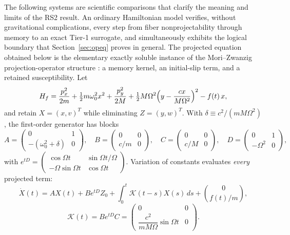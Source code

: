 \documentclass[11pt,a4paper]{article}
\theoremstyle{plain}
\theoremstyle{definition}
\begin{document}
The following systems are scientific comparisons that clarify the meaning
and limits of the RS2 result. An ordinary Hamiltonian model verifies, without gravitational
complications, every step from fiber nonprojectability through memory to
an exact Tier-1 surrogate, and simultaneously exhibits the logical
boundary that Section~\ref{sec:opeq} proves in general. The projected
equation obtained below is the elementary exactly soluble instance of the
Mori--Zwanzig projection-operator structure \cite{MoriZwanzig}: a memory
kernel, an initial-slip term, and a retained susceptibility. Let
\begin{equation}
\label{eq:Hosc}
H_f=\frac{p_x^2}{2m}+\tfrac12 m\omega_0^2x^2
+\frac{p_y^2}{2M}
+\tfrac12 M\Omega^2\Bigl(y-\frac{cx}{M\Omega^2}\Bigr)^2
-f(t)\,x ,
\end{equation}
and retain $X=(x,v)^T$ while eliminating $Z=(y,w)^T$. With
$\delta\equiv c^2/(mM\Omega^2)$, the first-order generator has blocks
\begin{equation}
\label{eq:blocks}
A=\begin{pmatrix}0&1\\-(\omega_0^2+\delta)&0\end{pmatrix},
\quad
B=\begin{pmatrix}0&0\\c/m&0\end{pmatrix},
\quad
C=\begin{pmatrix}0&0\\c/M&0\end{pmatrix},
\quad
D=\begin{pmatrix}0&1\\-\Omega^2&0\end{pmatrix},
\end{equation}
with
$e^{tD}=\begin{pmatrix}\cos\Omega t&\sin\Omega t/\Omega\\
-\Omega\sin\Omega t&\cos\Omega t\end{pmatrix}$.
Variation of constants evaluates \emph{every} projected term:
\begin{equation}
\label{eq:oscproj}
\dot X(t)=AX(t)+Be^{tD}Z_0
+\int_0^t\mathcal K(t-s)X(s)\,ds
+\binom{0}{f(t)/m},
\end{equation}
\begin{equation}
\label{eq:oscK}
\boxed{\;
\mathcal K(t)=Be^{tD}C
=\begin{pmatrix}
0&0\\[2pt]
\dfrac{c^2}{mM\Omega}\sin\Omega t&0
\end{pmatrix}.
\;}
\end{equation}
\end{document}
